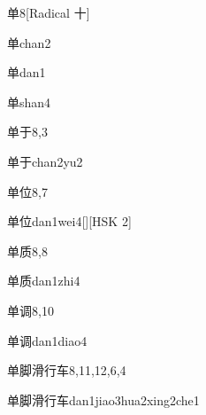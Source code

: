 \begin{entry}{单}{8}[Radical 十]
  \begin{phonetics}{单}{chan2}
  \end{phonetics}
  \begin{phonetics}{单}{dan1}
  \end{phonetics}
  \begin{phonetics}{单}{shan4}
  \end{phonetics}
\end{entry}

\begin{entry}{单于}{8,3}
  \begin{phonetics}{单于}{chan2yu2}
  \end{phonetics}
\end{entry}

\begin{entry}{单位}{8,7}
  \begin{phonetics}{单位}{dan1wei4}[][HSK 2]
  \end{phonetics}
\end{entry}

\begin{entry}{单质}{8,8}
  \begin{phonetics}{单质}{dan1zhi4}
  \end{phonetics}
\end{entry}

\begin{entry}{单调}{8,10}
  \begin{phonetics}{单调}{dan1diao4}
  \end{phonetics}
\end{entry}

\begin{entry}{单脚滑行车}{8,11,12,6,4}
  \begin{phonetics}{单脚滑行车}{dan1jiao3hua2xing2che1}
  \end{phonetics}
\end{entry}

